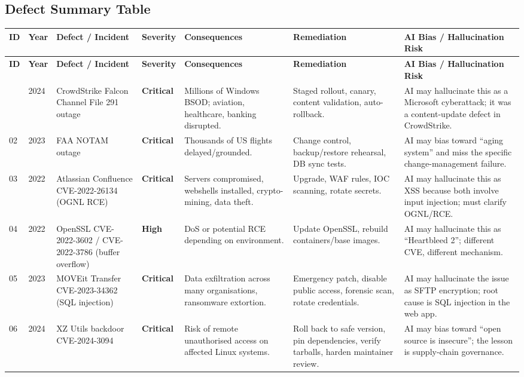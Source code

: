 \documentclass[12pt, a4paper]{article}
\newcommand{\scrit}{\textcolor{CritSev}{\textbf{Critical}}}
\newcommand{\shigh}{\textcolor{HighSev}{\textbf{High}}}
\begin{document}
\subsection{Defect Summary Table}

{\small
\begin{longtable}{@{} C{0.6cm} C{0.7cm} L{2.8cm} L{2.6cm} L{2.4cm} L{2.4cm} L{2.5cm} @{}}
\toprule
{}
\textbf{ID} & \textbf{Year} & \textbf{Defect / Incident} & \textbf{Severity} & \textbf{Consequences} & \textbf{Remediation} & \textbf{AI Bias / Hallucination Risk} \\
\midrule
\endfirsthead
\toprule
{}
\textbf{ID} & \textbf{Year} & \textbf{Defect / Incident} & \textbf{Severity} & \textbf{Consequences} & \textbf{Remediation} & \textbf{AI Bias / Hallucination Risk} \\
\midrule
\endhead
\bottomrule
{} & 2024 & CrowdStrike Falcon Channel File 291 outage & \scrit & Millions of Windows BSOD; aviation, healthcare, banking disrupted. & Staged rollout, canary, content validation, auto-rollback. & AI may hallucinate this as a Microsoft cyberattack; it was a content-update defect in CrowdStrike. \\
02 & 2023 & FAA NOTAM outage & \scrit & Thousands of US flights delayed/grounded. & Change control, backup/restore rehearsal, DB sync tests. & AI may bias toward ``aging system'' and miss the specific change-management failure. \\
03 & 2022 & Atlassian Confluence CVE-2022-26134 (OGNL RCE) & \scrit & Servers compromised, webshells installed, crypto-mining, data theft. & Upgrade, WAF rules, IOC scanning, rotate secrets. & AI may hallucinate this as XSS because both involve input injection; must clarify OGNL/RCE. \\
04 & 2022 & OpenSSL CVE-2022-3602 / CVE-2022-3786 (buffer overflow) & \shigh & DoS or potential RCE depending on environment. & Update OpenSSL, rebuild containers/base images. & AI may hallucinate this as ``Heartbleed 2''; different CVE, different mechanism. \\
05 & 2023 & MOVEit Transfer CVE-2023-34362 (SQL injection) & \scrit & Data exfiltration across many organisations, ransomware extortion. & Emergency patch, disable public access, forensic scan, rotate credentials. & AI may hallucinate the issue as SFTP encryption; root cause is SQL injection in the web app. \\
06 & 2024 & XZ Utils backdoor CVE-2024-3094 & \scrit & Risk of remote unauthorised access on affected Linux systems. & Roll back to safe version, pin dependencies, verify tarballs, harden maintainer review. & AI may bias toward ``open source is insecure''; the lesson is supply-chain governance. \\

\end{longtable}}
\end{document}
